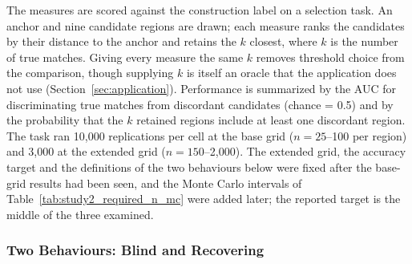 \documentclass[AMA,Times1COL]{WileyNJDv5}
\begin{document}
The measures are scored against the construction label on a selection task. An anchor and nine candidate regions are drawn; each measure ranks the candidates by their distance to the anchor and retains the $k$ closest, where $k$ is the number of true matches. Giving every measure the same $k$ removes threshold choice from the comparison, though supplying $k$ is itself an oracle that the application does not use (Section~\ref{sec:application}). Performance is summarized by the AUC for discriminating true matches from discordant candidates (chance = 0.5) and by the probability that the $k$ retained regions include at least one discordant region. The task ran 10{,}000 replications per cell at the base grid ($n = 25$--100 per region) and 3{,}000 at the extended grid ($n = 150$--2{,}000). The extended grid, the accuracy target and the definitions of the two behaviours below were fixed after the base-grid results had been seen, and the Monte Carlo intervals of Table~\ref{tab:study2_required_n_mc} were added later; the reported target is the middle of the three examined.

\subsubsection{Two Behaviours: Blind and Recovering}\label{sec:study1_classification}
\end{document}
